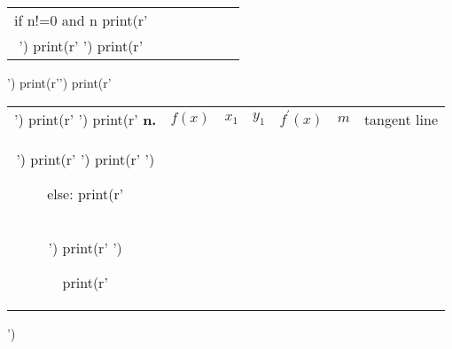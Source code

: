 \documentclass[ebook,12pt,oneside,openany]{memoir} %
\begin{document}
\begin{sympycode}
\begin{tabular}{|C{\OutColWidthSml}|C{\OutColWidthMed}|C{\OutColWidthSml}|C{\OutColWidthSml}|C{\OutColWidthMed}|C{\OutColWidthSml}|C{\OutColWidthBig}|}
	if n!=0 and n %
		print(r' &  &  &  &  &  & \vphantom{\resizebox{!}{\ColHeight}{$|$}}  \vphantom{\resizebox{!}{\ColHeight}{$|$}} \\ ')
		print(r' \hline ')
		print(r'\end{tabular} ')
		print(r'\newpage ')
		print(r' \begin{tabular}{|C{\OutColWidthSml}|C{\OutColWidthMed}|C{\OutColWidthSml}|C{\OutColWidthSml}|C{\OutColWidthMed}|C{\OutColWidthSml}|C{\OutColWidthBig}|} ')
		print(r' \hline ')
		print(r'    \textbf{n.}    &     $f(x)$      &    $x_1$       &    $y_1$       &     $f^{\prime}(x)$     &     $m$     &  \vphantom{\resizebox{!}{\ColHeight}{$|$}}  tangent line  \vphantom{\resizebox{!}{\ColHeight}{$|$}}  \\ ')
		print(r' \hline ')
		print(r' \hline ')

	else:
		print(r' &    &  &   &   &   & \vphantom{\resizebox{!}{\ColHeight}{$|$}}  \vphantom{\resizebox{!}{\ColHeight}{$|$}} \\ ')
		print(r' \hline ')


print(r'\end{tabular} ')

\end{sympycode}




\thispagestyle{empty}



\newpage
\end{document}
